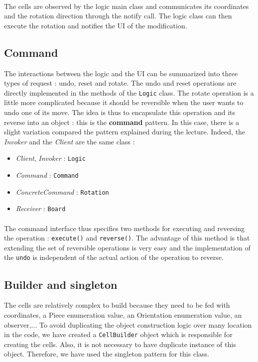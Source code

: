 \documentclass[a4paper,11pt]{article}
\begin{document}
\paragraph{}
The cells are observed by the logic main class and communicates its coordinates and the rotation direction through the notify call. The logic class can then execute the rotation and notifies the UI of the modification.
\subsection{Command}
The interactions between the logic and the UI can be summarized into three types of request : undo, reset and rotate.  The undo and reset operations are directly implemented in the methods of the \texttt{Logic} class. The rotate operation is a little more complicated because it should be reversible when the user wants to undo one of its move. The idea is thus to encapsulate this operation and its reverse into an object : this is the \textbf{command} pattern. In this case, there is a slight variation compared the pattern explained during the lecture. Indeed, the \textit{Invoker} and the \textit{Client} are the same class : 
\begin{itemize}
	\item \textit{Client}, \textit{Invoker} : \texttt{Logic}
	\item \textit{Command} : \texttt{Command}
	\item \textit{ConcreteCommand} : \texttt{Rotation}
	\item \textit{Receiver} : \texttt{Board}
\end{itemize}
\paragraph{}
The command interface thus specifies two methods for executing and reversing the operation : \texttt{execute()} and \texttt{reverse()}. The advantage of this method is that extending the set of reversible operations is very easy and the implementation of the \texttt{undo} is independent of the actual action of the operation to reverse. 
\subsection{Builder and singleton}
The cells are relatively complex to build because they need to be fed with coordinates, a Piece enumeration value, an Orientation enumeration value, an observer,... To avoid duplicating the object construction logic over many location in the code, we have created a \texttt{CellBuilder} object which is responsible for creating the cells. Also, it is not necessary to have duplicate instance of this object. Therefore, we have used the singleton pattern for this class.
\label{sec:patterns}
\end{document}
